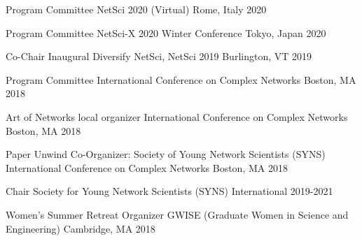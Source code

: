 \begin{cvhonors}
\cvhonor
	{Program Committee} %
	{NetSci 2020} %
	{(Virtual) Rome, Italy} %
	{2020} %
	
\cvhonor
	{Program Committee} %
	{NetSci-X 2020 Winter Conference} %
	{Tokyo, Japan} %
	{2020} %
	
\cvhonor
	{Co-Chair} %
	{Inaugural Diversify NetSci, NetSci 2019} %
	{Burlington, VT} %
	{2019} %




  \cvhonor
    {Program Committee} %
    {International Conference on Complex Networks} %
    {Boston, MA} %
    {2018} %

  \cvhonor
    {Art of Networks local organizer} %
    {International Conference on Complex Networks} %
    {Boston, MA} %
    {2018} %

  \cvhonor
    {Paper Unwind Co-Organizer: Society of Young Network Scientists (SYNS)} %
    {International Conference on Complex Networks} %
    {Boston, MA} %
    {2018} %
\end{cvhonors}

\vspace{3mm}

{}

\begin{cvhonors}
\cvhonor
	{Chair} %
	{Society for Young Network Scientists (SYNS)} %
	{International} %
	{2019-2021} %

\cvhonor
	{Women's Summer Retreat Organizer} %
	{GWISE (Graduate Women in Science and Engineering)} %
	{Cambridge, MA} %
	{2018} %

\end{cvhonors}

